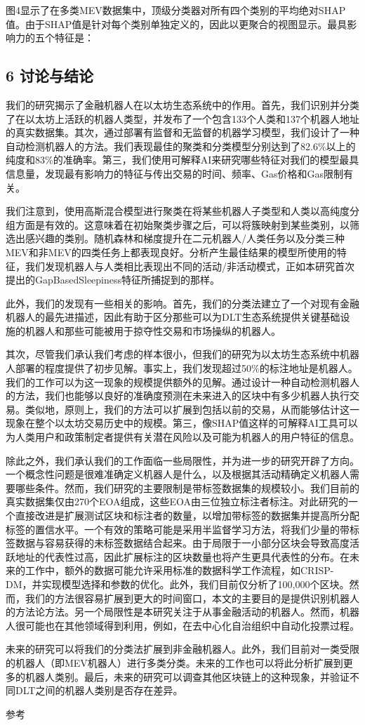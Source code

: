图4显示了在多类MEV数据集中，顶级分类器对所有四个类别的平均绝对SHAP值。由于SHAP值是针对每个类别单独定义的，因此以更聚合的视图显示。最具影响力的五个特征是：

\subsection*{6 讨论与结论}

我们的研究揭示了金融机器人在以太坊生态系统中的作用。首先，我们识别并分类了在以太坊上活跃的机器人类型，并发布了一个包含133个人类和137个机器人地址的真实数据集。其次，通过部署有监督和无监督的机器学习模型，我们设计了一种自动检测机器人的方法。我们表现最佳的聚类和分类模型分别达到了82.6\%以上的纯度和83\%的准确率。第三，我们使用可解释AI来研究哪些特征对我们的模型最具信息量，发现最有影响力的特征与传出交易的时间、频率、Gas价格和Gas限制有关。

我们注意到，使用高斯混合模型进行聚类在将某些机器人子类型和人类以高纯度分组方面是有效的。这意味着在初始聚类步骤之后，可以将簇映射到某些类别，以筛选出感兴趣的类别。随机森林和梯度提升在二元机器人/人类任务以及分类三种MEV和非MEV的四类任务上都表现良好。分析产生最佳结果的模型所使用的特征，我们发现机器人与人类相比表现出不同的活动/非活动模式，正如本研究首次提出的GapBasedSleepiness特征所捕捉到的那样。

此外，我们的发现有一些相关的影响。首先，我们的分类法建立了一个对现有金融机器人的最先进描述，因此有助于区分那些可以为DLT生态系统提供关键基础设施的机器人和那些可能被用于掠夺性交易和市场操纵的机器人。

其次，尽管我们承认我们考虑的样本很小，但我们的研究为以太坊生态系统中机器人部署的程度提供了初步见解。事实上，我们发现超过50\%的标注地址是机器人。我们的工作可以为这一现象的规模提供额外的见解。通过设计一种自动检测机器人的方法，我们也能够以良好的准确度预测在未来进入的区块中有多少机器人执行交易。类似地，原则上，我们的方法可以扩展到包括以前的交易，从而能够估计这一现象在整个以太坊交易历史中的规模。第三，像SHAP值这样的可解释AI工具可以为人类用户和政策制定者提供有关潜在风险以及可能为机器人的用户特征的信息。

除此之外，我们承认我们的工作面临一些局限性，并为进一步的研究开辟了方向。一个概念性问题是很难准确定义机器人是什么，以及根据其活动精确定义机器人需要哪些条件。然而，我们研究的主要限制是带标签数据集的规模较小。我们目前的真实数据集仅由270个EOA组成，这些EOA由三位独立标注者标注。对此研究的一个直接改进是扩展测试区块和标注者的数量，以增加带标签的数据集并提高所分配标签的置信水平。一个有效的策略可能是采用半监督学习方法，将我们少量的带标签数据与容易获得的未标签数据结合起来。由于局限于一小部分区块会导致高度活跃地址的代表性过高，因此扩展标注的区块数量也将产生更具代表性的分布。在未来的工作中，额外的数据可能允许采用标准的数据科学工作流程，如CRISP-DM，并实现模型选择和参数的优化。此外，我们目前仅分析了100,000个区块。然而，我们的方法很容易扩展到更大的时间窗口，本文的主要目的是提供识别机器人的方法论方法。另一个局限性是本研究关注于从事金融活动的机器人。然而，机器人很可能也在其他领域得到利用，例如，在去中心化自治组织中自动化投票过程。

未来的研究可以将我们的分类法扩展到非金融机器人。此外，我们目前对一类受限的机器人（即MEV机器人）进行多类分类。未来的工作也可以将此分析扩展到更多的机器人类别。最后，未来的研究可以调查其他区块链上的这种现象，并验证不同DLT之间的机器人类别是否存在差异。


参考~\cite{zjuthesisrules, zjuthesis}

\begingroup
    \printbibliography[title={外文翻译参考文献}]
\endgroup
